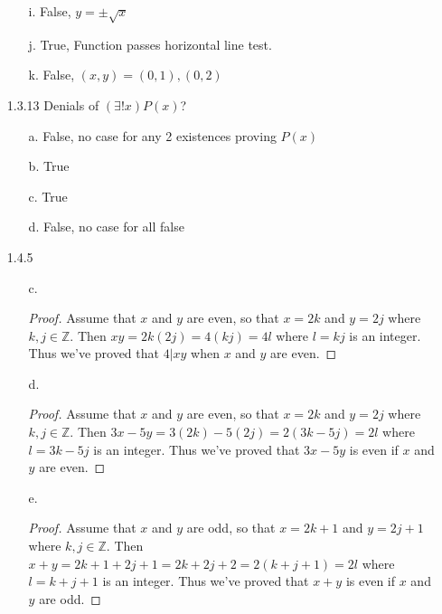 \documentclass[11pt]{amsart}
\theoremstyle{definition}
\begin{document}
\begin{itemize}
\begin{itemize}
    \item[i.] False, $y=\pm\sqrt{x}$

    \item[j.] True,  Function passes horizontal line test.
    
    \item[k.] False, $(x,y)=(0,1),(0,2)$
    
\end{itemize}

\item[1.3.13] Denials of $(\exists!x)P(x)$?
\begin{itemize}
    \item[a.] False, no case for any 2 existences proving $P(x)$

    \item[b.] True

    \item[c.] True

    \item[d.] False, no case for all false
    
\end{itemize}



\item[1.4.5]
\begin{itemize}
    \item[c.] \begin{proof}
        Assume that $x$ and $y$ are even, so that $x=2k$ and $y=2j$ where $k,j\in\mathbb{Z}$. Then $xy=2k(2j)=4(kj)=4l$ where $l=kj$ is an integer. Thus we've proved that $4|xy$ when $x$ and $y$ are even.
    \end{proof}

    \item[d.] \begin{proof}
        Assume that $x$ and $y$ are even, so that $x=2k$ and $y=2j$ where $k,j\in\mathbb{Z}$. Then $3x-5y=3(2k)-5(2j)=2(3k-5j)=2l$ where $l=3k-5j$ is an integer. Thus we've proved that $3x-5y$ is even if $x$ and $y$ are even.
    \end{proof}
    
    \item[e.] \begin{proof}
        Assume that $x$ and $y$ are odd, so that $x=2k+1$ and $y=2j+1$ where $k,j\in\mathbb{Z}$. Then $x+y=2k+1+2j+1=2k+2j+2=2(k+j+1)=2l$ where $l=k+j+1$ is an integer. Thus we've proved that $x+y$ is even if $x$ and $y$ are odd.
    \end{proof}


\end{itemize}
\end{itemize}
\end{document}
